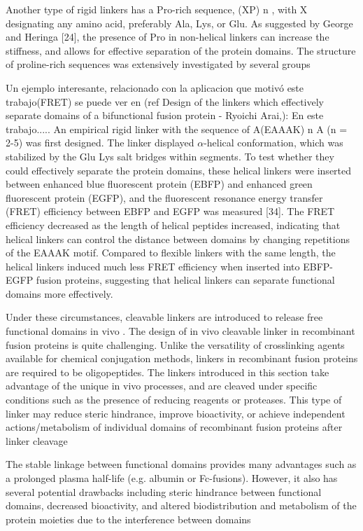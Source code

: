 Another type of rigid linkers has a Pro-rich sequence, (XP) n , with X designating any amino
acid, preferably Ala, Lys, or Glu. As suggested by George and Heringa [24], the presence of
Pro in non-helical linkers can increase the stiffness, and allows for effective separation of
the protein domains. The structure of proline-rich sequences was extensively investigated by
several groups

Un ejemplo interesante, relacionado con la aplicacion que motivó este trabajo(FRET) se puede ver en (ref Design of the linkers which effectively separate domains of a bifunctional fusion protein - Ryoichi Arai,): 
En este trabajo.....
An empirical rigid linker with the sequence of A(EAAAK) n A (n = 2-5) was first designed.
The linker displayed  $\alpha$-helical conformation, which was stabilized by
the Glu Lys salt bridges within segments. To test whether they could effectively separate
the protein domains, these helical linkers were inserted between enhanced blue fluorescent
protein (EBFP) and enhanced green fluorescent protein (EGFP), and the fluorescent
resonance energy transfer (FRET) efficiency between EBFP and EGFP was measured [34].
The FRET efficiency decreased as the length of helical peptides increased, indicating that
helical linkers can control the distance between domains by changing repetitions of the
EAAAK motif. Compared to flexible linkers with the same length, the helical linkers
induced much less FRET efficiency when inserted into EBFP-EGFP fusion proteins,
suggesting that helical linkers can separate functional domains more effectively.


Under these circumstances, cleavable linkers are introduced to release free functional
domains in vivo . The design of in vivo cleavable linker in recombinant fusion proteins is
quite challenging. Unlike the versatility of crosslinking agents available for chemical
conjugation methods, linkers in recombinant fusion proteins are required to be
oligopeptides. The linkers introduced in this section take advantage of the unique in vivo
processes, and are cleaved under specific conditions such as the presence of reducing
reagents or proteases. This type of linker may reduce steric hindrance, improve bioactivity,
or achieve independent actions/metabolism of individual domains of recombinant fusion
proteins after linker cleavage





The stable linkage between
functional domains provides many advantages such as a prolonged plasma half-life (e.g.
albumin or Fc-fusions). However, it also has several potential drawbacks including steric
hindrance between functional domains, decreased bioactivity, and altered biodistribution and
metabolism of the protein moieties due to the interference between domains 


